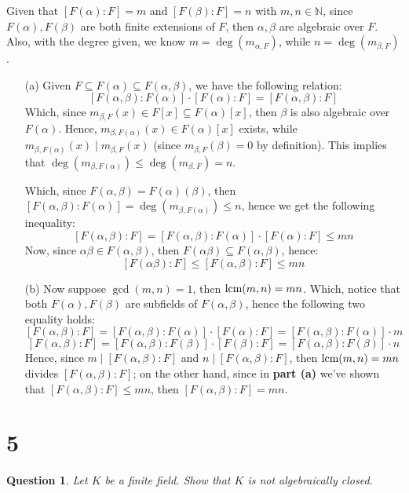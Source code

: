 \documentclass{article}
\newtheorem{question}{Question}
\begin{document}
Given that $[F(\alpha):F]=m$ and $[F(\beta):F]=n$ with $m,n\in\mathbb{N}$, since $F(\alpha),F(\beta)$ are both finite extensions of $F$, then $\alpha,\beta$ are algebraic over $F$. Also, with the degree given, we know $m = \deg(m_{\alpha,F})$, while $n=\deg(m_{\beta,F})$.
\begin{itemize}
    \item[(a)]
    Given $F\subseteq F(\alpha)\subseteq F(\alpha,\beta)$, we have the following relation:
    $$[F(\alpha,\beta):F(\alpha)]\cdot [F(\alpha):F]=[F(\alpha,\beta):F]$$
    Which, since $m_{\beta,F}(x)\in F[x]\subseteq F(\alpha)[x]$, then $\beta$ is also algebraic over $F(\alpha)$. Hence, $m_{\beta,F(\alpha)}(x)\in F(\alpha)[x]$ exists, while $m_{\beta,F(\alpha)}(x)\mid m_{\beta,F}(x)$ (since $m_{\beta,F}(\beta)=0$ by definition).
    This implies that $\deg(m_{\beta,F(\alpha)})\leq \deg(m_{\beta,F}) = n$.

    Which, since $F(\alpha,\beta) = F(\alpha)(\beta)$, then $[F(\alpha,\beta):F(\alpha)] = \deg(m_{\beta,F(\alpha)}) \leq n$, hence we get the following inequality:
    $$[F(\alpha,\beta):F]=[F(\alpha,\beta):F(\alpha)]\cdot [F(\alpha):F]\leq mn$$
    Now, since $\alpha\beta\in F(\alpha,\beta)$, then $F(\alpha\beta)\subseteq F(\alpha,\beta)$, hence:
    $$[F(\alpha\beta):F]\leq [F(\alpha,\beta):F]\leq mn$$

    \hfil

    \item[(b)] Now suppose $\gcd(m,n)=1$, then $\textmd{lcm}(m,n)=mn$. Which, notice that both $F(\alpha),F(\beta)$ are subfields of $F(\alpha,\beta)$, hence the following two equality holds:
    $$[F(\alpha,\beta):F]=[F(\alpha,\beta):F(\alpha)]\cdot [F(\alpha):F] = [F(\alpha,\beta):F(\alpha)]\cdot m$$
    $$[F(\alpha,\beta):F]=[F(\alpha,\beta):F(\beta)]\cdot [F(\beta):F] = [F(\alpha,\beta):F(\beta)]\cdot n$$
    Hence, since $m\mid [F(\alpha,\beta):F]$ and $n\mid [F(\alpha,\beta):F]$, then $\textmd{lcm}(m,n)=mn$ divides $[F(\alpha,\beta):F]$; on the other hand, since in \textbf{part (a)} we've shown that $[F(\alpha,\beta):F]\leq mn$, then $[F(\alpha,\beta):F] = mn$.
\end{itemize}

\break

\section*{5}
\begin{myBox}[]{}
    \begin{question}
        Let $K$ be a finite field. Show that $K$ is not algebraically closed.
    \end{question}
\end{myBox}
\end{document}
